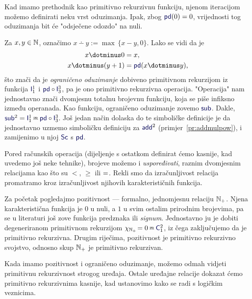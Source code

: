 Kad imamo prethodnik kao primitivno rekurzivnu funkciju, njenom iteracijom mo\-že\-mo definirati neku vrst oduzimanja. Ipak, zbog $\f{pd}(0)=0$, vrijednosti tog oduzimanja bit će "odsječene odozdo" na nuli.

\begin{primjer}[{name=[primitivna rekurzivnost ograničenog oduzimanja]}]\label{pr:sub}
Za $x,y\in{\mathbb N}$, označimo $x\dotminus y:=\max\,\{x-y,0\}$. Lako se vidi da je
\begin{align}
    x\dotminus0&=x\text,\\
    x\dotminus(y+1)&=\f{pd}(x\dotminus y)\text,
\end{align}
što znači da je \emph{ograničeno oduzimanje} dobiveno primitivnom rekurzijom iz funkcija $\f I_1^1$ i $\f{pd}\circ\f I_3^3$, pa je ono primitivno rekurzivna operacija. "Operacija" nam jednostavno znači dvomjesnu totalnu brojevnu funkciju, koja se piše infiksno između operanada. Kao funkciju, ograničeno oduzimanje zovemo $\f{sub}$. Dakle, $\f{sub}^2=\f I_1^1\pr\f{pd}\circ\f I_3^3$. Još jedan način dolaska do te simboličke definicije je da jednostavno uzmemo simboličku definiciju za $\f{add}^2$ (primjer~\ref{pr:addmulpow}), i zamijenimo u njoj $\f{Sc}$ s $\f{pd}$.
\end{primjer}

Pored računskih operacija (dijeljenje s ostatkom definirat ćemo kasnije, kad uvedemo još neke tehnike), brojeve možemo i \emph{uspoređivati}, raznim dvomjesnim relacijama  kao što su $<$, $\ge$ ili $=$. Rekli smo da izračunljivost relacija promatramo kroz izračunljivost njihovih karakterističnih funkcija.

\begin{primjer}[{name=[primitivna rekurzivnost pozitivnosti]}]\label{pr:N+prn}
Za početak pogledajmo pozitivnost --- formalno, jednomjesnu relaciju ${\mathbb N}_+$. Njena karakteristična funkcija je $0$ u nuli, a $1$ u svim ostalim prirodnim brojevima, pa se u literaturi još zove funkcija predznaka ili \emph{signum}. Jednostavno ju je dobiti degeneriranom primitivnom rekurzijom $\chi_{\N_+}\!=0\pr\f C_1^2$, iz čega zaključujemo da je primitivno rekurzivna. Drugim riječima, pozitivnost je primitivno rekurzivno svojstvo, odnosno skup ${\mathbb N}_+$ je primitivno rekurzivan.
\end{primjer}

Kada imamo pozitivnost i ograničeno oduzimanje, možemo odmah vidjeti primitivnu rekurzivnost strogog uređaja. Ostale uređajne relacije dokazat ćemo primitivno rekurzivnima kasnije, kad ustanovimo kako se radi s logičkim veznicima.

